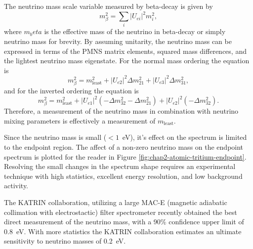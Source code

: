 The neutrino mass scale variable measured by beta-decay is given by 
\begin{equation}
    m_\beta^2=\sum_i{|U_{ei}|^2}m_i^2,
\end{equation}
where $m_beta$ is the effective mass of the neutrino in beta-decay or simply neutrino mass for brevity. By assuming unitarity, the neutrino mass can be expressed in terms of the PMNS matrix elements, squared mass differences, and the lightest neutrino mass eigenstate. For the normal mass ordering the equation is
\begin{equation}
    m_\beta^2=m^2_\textrm{least} + |U_{e2}|^2\Delta m_{21}^2 +|U_{e3}|^2\Delta m_{31}^2,
\end{equation} 
and for the inverted ordering the equation is 
\begin{equation}
    m_\beta^2=m^2_\textrm{least}+|U_{e1}|^2(-\Delta m_{32}^2-\Delta m_{21}^2)+|U_{e2}|^2(-\Delta m_{32}^2).
\end{equation}
Therefore, a measurement of the neutrino mass in combination with neutrino mixing parameters is effectively a measurement of $m_\textrm{least}$.

Since the neutrino mass is small ($<1$~eV), it's effect on the spectrum is limited to the endpoint region. The affect of a non-zero neutrino mass on the endpoint spectrum is plotted for the reader in Figure \ref{fig:chap2-atomic-tritium-endpoint}. Resolving the small changes in the spectrum shape requires an experimental technique with high statistics, excellent energy resolution, and low background activity. 

The KATRIN collaboration, utilizing a large MAC-E (magnetic adiabatic collimation with electrostactic) filter spectrometer recently obtained the best direct measurement of the neutrino mass, with a 90\% confidence upper limit of 0.8~eV. With more statistics the KATRIN collaboration estimates an ultimate sensitivity to neutrino masses of 0.2~eV.